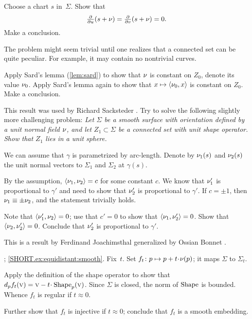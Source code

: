 \begin{multicols}{2}
Choose a chart $s$ in~$\Sigma$.
Show that
\[\tfrac{\partial }{\partial u}(s+\nu)
=
\tfrac{\partial }{\partial v}(s+\nu)
=
0.\]
Make a conclusion.

The problem might seem trivial until one realizes that a connected set can be quite peculiar.
For example, it may contain no nontrivial curves.

\medskip

Apply Sard's lemma (\ref{lem:sard}) to show that $\nu$ is constant on $Z_0$, denote its value $\nu_0$.
Apply Sard's lemma again to show that $x\mapsto \langle \nu_0,x\rangle$ is constant on $Z_0$.
Make a conclusion.

 This result was used by Richard Sacksteder \cite[Lemma 6]{sacksteder}.
Try to solve the following slightly more challenging problem:
\textit{Let $\Sigma$ be a smooth surface with orientation defined by a unit normal field $\nu$,
and let $Z_1\subset \Sigma$ be a connected set with unit shape operator.
Show that $Z_1$ lies in a unit sphere.}


We can assume that $\gamma$ is parametrized by arc-length.
Denote by $\nu_1(s)$ and $\nu_2(s)$ the unit normal vectors to $\Sigma_1$ and $\Sigma_2$ at $\gamma(s)$.

By the assumption, $\langle \nu_1,\nu_2\rangle= c$ for some constant $c$.
We know that
$\nu_1'$ is proportional to $\gamma'$ and need to show that $\nu_2'$ is proportional to $\gamma'$.
If $c=\pm1$, then $\nu_1\equiv\pm \nu_2$, and the statement trivially holds.

Note that $\langle\nu_1',\nu_2\rangle=0$;
use that $c'=0$ to show that $\langle\nu_1,\nu_2'\rangle=0$.
Show that $\langle\nu_2,\nu_2'\rangle=0$.
Conclude that $\nu_2'$ is proportional to $\gamma'$.

 This is a result by Ferdinand Joachimsthal \cite{joachimsthal} generalized by Ossian Bonnet \cite{bonnet}.

\parbf{\ref{ex:equidistant}};
\ref{SHORT.ex:equidistant:smooth}.
Fix~$t$.
Set $f_t\:p\mapsto p+t\cdot\Norm(p)$; it maps $\Sigma$ to $\Sigma_t$.

Apply the definition of the shape operator to show that $d_pf_t(\vec v)=\vec v-t\cdot\Shape_p(\vec v)$.
Since $\Sigma$ is closed, the norm of $\mathop{\rm Shape}\nolimits$ is bounded.
Whence $f_t$ is regular if $t\approx 0$.

Further show that $f_t$ is injective if $t\approx0$;
conclude that $f_t$ is a smooth embedding.


\end{multicols}
